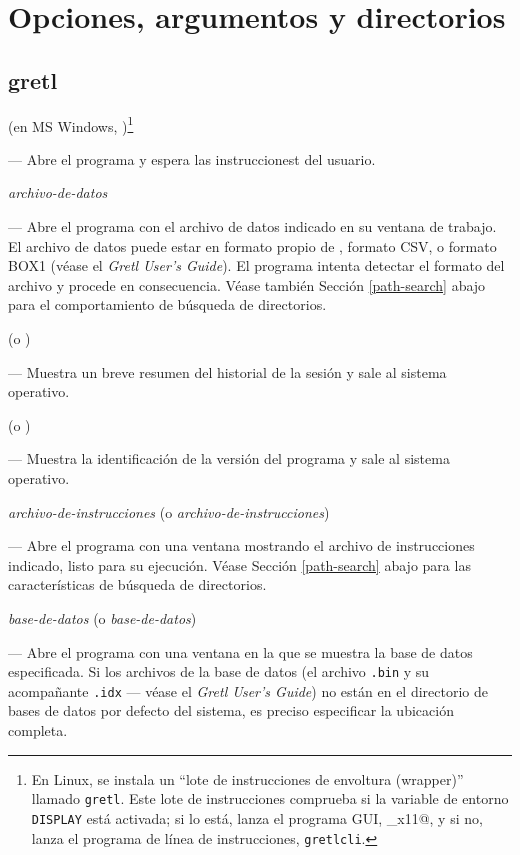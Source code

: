 \chapter{Opciones, argumentos y directorios}
\label{c-optarg}

\section{gretl}
\label{optarg1}

 (en MS Windows, )\footnote{En
  Linux, se instala un ``lote de instrucciones de envoltura
  (wrapper)'' llamado \texttt{gretl}. Este lote de instrucciones
  comprueba si la variable de entorno \texttt{DISPLAY} está activada;
  si lo está, lanza el programa GUI, \verb@gretl_x11@, y si no, lanza
  el programa de línea de instrucciones, \texttt{gretlcli}.}
    
--- Abre el programa y espera las instruccionest del usuario.

 \textsl{archivo-de-datos}

--- Abre el programa con el archivo de datos indicado en su ventana de
trabajo. El archivo de datos puede estar en formato propio de
, formato CSV, o formato BOX1 (véase el \emph{Gretl User's
  Guide}). El programa intenta detectar el formato del archivo y
procede en consecuencia. Véase también Sección \ref{path-search} abajo
para el comportamiento de búsqueda de directorios.

 (o )

--- Muestra un breve resumen del historial de la sesión y sale al
sistema operativo.

 (o )

--- Muestra la identificación de la versión del programa y sale al
sistema operativo.

 \textsl{archivo-de-instrucciones} (o 
\textsl{archivo-de-instrucciones})

--- Abre el programa con una ventana mostrando el archivo de
instrucciones indicado, listo para su ejecución. Véase Sección
\ref{path-search} abajo para las características de búsqueda de
directorios.

 \textsl{base-de-datos} (o 
\textsl{base-de-datos})

--- Abre el programa con una ventana en la que se muestra la base de
datos especificada. Si los archivos de la base de datos (el archivo
\texttt{.bin} y su acompañante \texttt{.idx} --- véase el \emph{Gretl
  User's Guide}) no están en el directorio de bases de datos por
defecto del sistema, es preciso especificar la ubicación completa.

